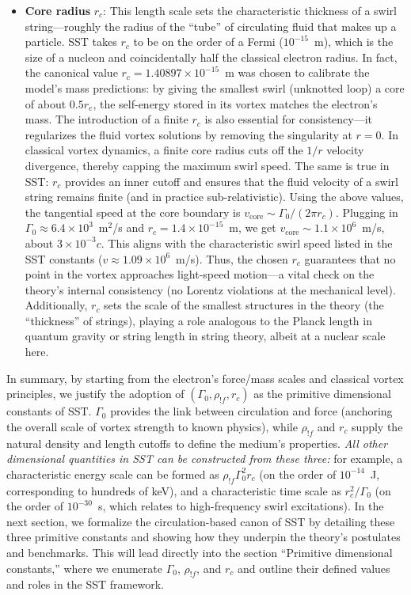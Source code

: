 \documentclass[11pt]{article}
\begin{document}
\begin{itemize}
        \item \textbf{Core radius} $r_c$: This length scale sets the characteristic thickness of a swirl string—roughly the radius of the “tube” of circulating fluid that makes up a particle. SST takes $r_c$ to be on the order of a Fermi ($10^{-15}$~m), which is the size of a nucleon and coincidentally half the classical electron radius. In fact, the canonical value $r_c=1.40897\times10^{-15}$~m was chosen to calibrate the model’s mass predictions: by giving the smallest swirl (unknotted loop) a core of about $0.5 r_e$, the self-energy stored in its vortex matches the electron’s mass. The introduction of a finite $r_c$ is also essential for consistency—it regularizes the fluid vortex solutions by removing the singularity at $r=0$. In classical vortex dynamics, a finite core radius cuts off the $1/r$ velocity divergence, thereby capping the maximum swirl speed. The same is true in SST: $r_c$ provides an inner cutoff and ensures that the fluid velocity of a swirl string remains finite (and in practice sub-relativistic). Using the above values, the tangential speed at the core boundary is $v_{\text{core}} \sim \Gamma_0/(2\pi r_c)$. Plugging in $\Gamma_0 \approx 6.4\times10^3$~m$^2$/s and $r_c = 1.4\times10^{-15}$~m, we get $v_{\text{core}} \sim 1.1\times10^6$~m/s, about $3\times10^{-3}c$. This aligns with the characteristic swirl speed listed in the SST constants ($v \approx 1.09\times10^6$~m/s). Thus, the chosen $r_c$ guarantees that no point in the vortex approaches light-speed motion—a vital check on the theory’s internal consistency (no Lorentz violations at the mechanical level). Additionally, $r_c$ sets the scale of the smallest structures in the theory (the “thickness” of strings), playing a role analogous to the Planck length in quantum gravity or string length in string theory, albeit at a nuclear scale here.
\end{itemize}

    In summary, by starting from the electron’s force/mass scales and classical vortex principles, we justify the adoption of $(\Gamma_0, \rho_{!f}, r_c)$ as the primitive dimensional constants of SST. $\Gamma_0$ provides the link between circulation and force (anchoring the overall scale of vortex strength to known physics), while $\rho_{!f}$ and $r_c$ supply the natural density and length cutoffs to define the medium’s properties. \textit{All other dimensional quantities in SST can be constructed from these three:} for example, a characteristic energy scale can be formed as $\rho_{!f}\Gamma_0^2 r_c$ (on the order of $10^{-14}$~J, corresponding to hundreds of keV), and a characteristic time scale as $r_c^2/\Gamma_0$ (on the order of $10^{-30}$~s, which relates to high-frequency swirl excitations). In the next section, we formalize the circulation-based canon of SST by detailing these three primitive constants and showing how they underpin the theory’s postulates and benchmarks. This will lead directly into the section “Primitive dimensional constants,” where we enumerate $\Gamma_0$, $\rho_{!f}$, and $r_c$ and outline their defined values and roles in the SST framework.
\end{document}
